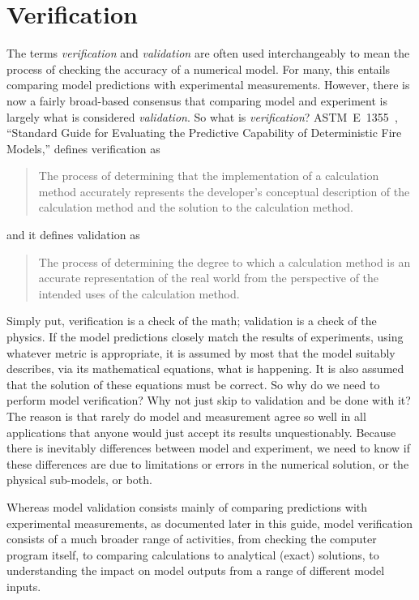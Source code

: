 
\chapter{Verification}

The terms {\em verification} and {\em validation} are often used interchangeably to mean the process of checking the accuracy of a numerical model. For many, this entails comparing model predictions with experimental measurements. However, there is now a fairly broad-based consensus that comparing model and experiment is largely what is considered {\em validation}. So what is {\em verification}? ASTM~E~1355~\cite{ASTM:E1355}, ``Standard Guide for Evaluating the Predictive Capability of Deterministic Fire Models,'' defines verification as
\begin{quote}
The process of determining that the implementation of a calculation method accurately represents the developer's conceptual description of the calculation method and the solution to the calculation method.
\end{quote}
and it defines validation as
\begin{quote}
The process of determining the degree to which a calculation method is an accurate representation of the real world from the perspective of the intended uses of the calculation method.
\end{quote}
Simply put, verification is a check of the math; validation is a check of the physics. If the model predictions closely match the results of experiments, using whatever metric is appropriate, it is assumed by most that the model suitably describes, via its mathematical equations, what is happening. It is also assumed that the solution of these equations must be correct. So why do we need to perform model verification? Why not just skip to validation and be done with it? The reason is that rarely do model and measurement agree so well in all applications that anyone would just accept its results unquestionably. Because there is inevitably differences between model and experiment, we need to know if these differences are due to limitations or errors in the numerical solution, or the physical sub-models, or both.

Whereas model validation consists mainly of comparing predictions with experimental measurements, as documented later in this guide, model verification consists of a much broader range of activities, from checking the computer program itself, to comparing calculations to analytical (exact) solutions, to understanding the impact on model outputs from a range of different model inputs.

